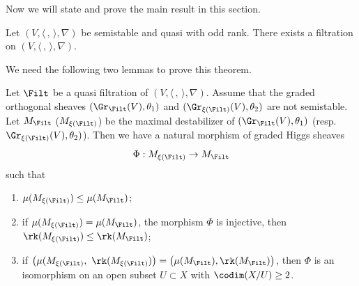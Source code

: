 Now we will state and prove the main result in this section.
\begin{thm}\label{main thm}
Let $(V,\langle \,, \, \rangle,\nabla)$ be semistable and quasi \grsemistable with odd rank. There exists a \grsemistable filtration on $(V,\langle \,, \, \rangle,\nabla)$.
\end{thm}

We need the following two lemmas to prove this theorem.
\begin{lem}\label{decrease}
Let $\Filt$ be a quasi \grsemistable filtration of $(V, \langle \,, \, \rangle, \nabla)$. Assume that the graded orthogonal sheaves $(\Gr_{\Filt}(V),\theta_1)$ and $(\Gr_{\xi(\Filt)}(V),\theta_2)$ are not semistable. Let $M_{\Filt}$ (\resp $M_{\xi(\Filt)}$) be the maximal destabilizer of $(\Gr_{\Filt}(V),\theta_1)$ (resp.\ $\Gr_{\xi(\Filt)}(V),\theta_2)$). Then we have a natural morphism of graded Higgs sheaves
\[
\Phi: M_{\xi(\Filt)}\to M_{\Filt}
\]
such that
\begin{enumerate}
\item $\mu(M_{\xi(\Filt)})\leq \mu(M_{\Filt})$;
\item if $\mu(M_{\xi(\Filt)})= \mu(M_{\Filt})$, the morphism $\Phi$ is injective, then $\rk(M_{\xi(\Filt)})\leq\rk(M_{\Filt})$;
\item if $\big(\mu(M_{\xi(\Filt)},\ \rk(M_{\xi(\Filt)})\big)= \big(\mu(M_{\Filt}),\rk(M_{\Filt})\big)$, then $\Phi$ is an isomorphism on an open subset $U \subset X$ with $\codim(X/U) \geq 2$.
\end{enumerate}
\end{lem}

